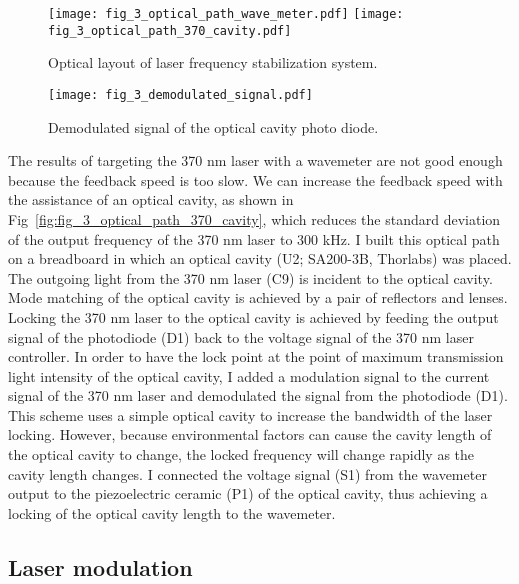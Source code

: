 \begin{figure}
    \centering
    {\texttt{[image: fig\_3\_optical\_path\_wave\_meter.pdf]}}
    {\texttt{[image: fig\_3\_optical\_path\_370\_cavity.pdf]}}
    \caption{Optical layout of laser frequency stabilization system.}
\end{figure}

\begin{figure}
    \centering
    \texttt{[image: fig\_3\_demodulated\_signal.pdf]}
    \caption{Demodulated signal of the optical cavity photo diode.}
\end{figure}

The results of targeting the 370 nm laser with a wavemeter are not good enough because the feedback speed is too slow. We can increase the feedback speed with the assistance of an optical cavity, as shown in Fig~\ref{fig:fig_3_optical_path_370_cavity}, which reduces the standard deviation of the output frequency of the 370 nm laser to 300 kHz. I built this optical path on a breadboard in which an optical cavity (U2; SA200-3B, Thorlabs) was placed. The outgoing light from the 370 nm laser (C9) is incident to the optical cavity. Mode matching of the optical cavity is achieved by a pair of reflectors and lenses. Locking the 370 nm laser to the optical cavity is achieved by feeding the output signal of the photodiode (D1) back to the voltage signal of the 370 nm laser controller. In order to have the lock point at the point of maximum transmission light intensity of the optical cavity, I added a modulation signal to the current signal of the 370 nm laser and demodulated the signal from the photodiode (D1). This scheme uses a simple optical cavity to increase the bandwidth of the laser locking. However, because environmental factors can cause the cavity length of the optical cavity to change, the locked frequency will change rapidly as the cavity length changes. I connected the voltage signal (S1) from the wavemeter output to the piezoelectric ceramic (P1) of the optical cavity, thus achieving a locking of the optical cavity length to the wavemeter.

\subsection{Laser modulation}

